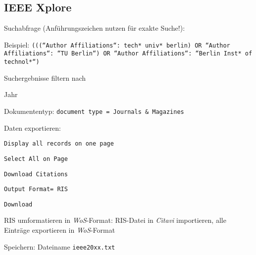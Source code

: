 \subsection*{IEEE Xplore}
\begin{compactitem}
\item Suchabfrage (Anführungszeichen nutzen für exakte Suche!):
	\begin{compactitem}
    \item Beispiel: \texttt{(((``Author Affiliations``: tech* univ* berlin) OR ``Author Affiliations``: ``TU Berlin``) OR ``Author Affiliations``: \newline``Berlin Inst* of technol*``)}
    \end{compactitem}
\item Suchergebnisse filtern nach
	\begin{compactitem}
    \item Jahr
    \item Dokumententyp: \texttt{document type = Journals \& Magazines}
    \end{compactitem}
\item Daten exportieren: 
	\begin{compactitem}
	\item \texttt{Display all records on one page}
    \item \texttt{Select All on Page}
    \item \texttt{Download Citations}
    \item \texttt{Output Format= RIS}
    \item \texttt{Download} 
	\end{compactitem}
\item RIS umformatieren in \textit{WoS}-Format: RIS-Datei in \textit{Citavi} importieren, alle Einträge exportieren in \textit{WoS}-Format
\item Speichern: Dateiname \texttt{ieee20xx.txt}
\end{compactitem}

\pagebreak

